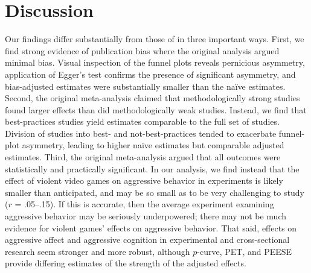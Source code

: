 \documentclass[man, mask]{apa6}
\begin{document}
\section{Discussion}
Our findings differ substantially from those of \citet{Anderson:etal:2010} in three important ways. First, we find strong evidence of publication bias where the original analysis argued minimal bias. Visual inspection of the funnel plots reveals pernicious asymmetry, application of Egger's test confirms the presence of significant asymmetry, and bias-adjusted estimates were substantially smaller than the na{\"i}ve estimates. Second, the original meta-analysis claimed that methodologically strong studies found larger effects than did methodologically weak studies. Instead, we find that best-practices studies yield estimates comparable to the full set of studies. Division of studies into best- and not-best-practices tended to exacerbate funnel-plot asymmetry, leading to higher na{\"i}ve estimates but comparable adjusted estimates.  
Third, the original meta-analysis argued that all outcomes were statistically and practically significant. In our analysis, we find instead that the effect of violent video games on aggressive behavior in experiments is likely smaller than anticipated, and may be so small as to be very challenging to study ($r$ = .05--.15). If this is accurate, then the average experiment examining aggressive behavior may be seriously underpowered; there may not be much evidence for violent games' effects on aggressive behavior. That said, effects on aggressive affect and aggressive cognition in experimental and cross-sectional research seem stronger and more robust, although $p$-curve, PET, and PEESE provide differing estimates of the strength of the adjusted effects.
 
\end{document}
